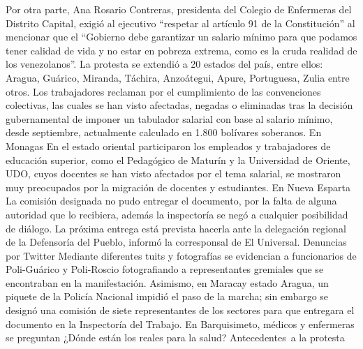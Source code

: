 \documentclass{article}%
\begin{document}
\newline%
%
Por otra parte, Ana Rosario Contreras,  presidenta del Colegio de Enfermeras del Distrito Capital, exigió al ejecutivo  “respetar al artículo 91 de la Constitución” al mencionar que el “Gobierno debe garantizar un salario mínimo para que podamos tener calidad de vida y no estar en pobreza extrema, como es la cruda realidad de los venezolanos”.%
\newline%
%
La protesta se extendió a 20 estados del país, entre ellos: Aragua, Guárico, Miranda, Táchira, Anzoátegui, Apure, Portuguesa, Zulia entre otros.%
\newline%
%
Los trabajadores reclaman por el cumplimiento de las convenciones colectivas, las cuales se han visto afectadas, negadas o eliminadas tras la decisión gubernamental de imponer un tabulador salarial con base al salario mínimo, desde septiembre, actualmente calculado en 1.800 bolívares soberanos.%
\newline%
%
En Monagas%
\newline%
%
En el estado oriental participaron los empleados y trabajadores de educación superior, como el Pedagógico de Maturín y la Universidad de Oriente, UDO, cuyos docentes se han visto afectados por el tema salarial, se mostraron muy  preocupados por la migración de docentes y estudiantes.%
\newline%
%
En Nueva Esparta%
\newline%
%
La comisión designada no pudo entregar el documento, por la falta de alguna autoridad que lo recibiera, además la inspectoría se negó a cualquier posibilidad de diálogo. La próxima entrega está prevista hacerla ante la delegación regional de la Defensoría del Pueblo, informó la corresponsal de El Universal.%
\newline%
%
Denuncias por Twitter%
\newline%
%
Mediante diferentes tuits y fotografías se evidencian a funcionarios de Poli{-}Guárico y Poli{-}Roscio fotografiando a representantes gremiales que se encontraban en la manifestación.%
\newline%
%
Asimismo, en Maracay estado Aragua, un piquete de la Policía Nacional impidió el paso de la marcha; sin embargo se designó una comisión de siete representantes de los sectores para que entregara el documento en la Inspectoría del Trabajo.%
\newline%
%
En Barquisimeto, médicos y enfermeras se preguntan ¿Dónde están los reales para la salud?%
\newline%
%
Antecedentes~a la protesta%
\end{document}
